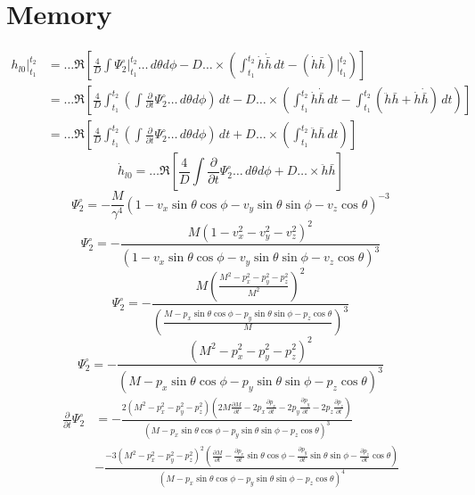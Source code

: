 \documentclass[a3paper]{ctexart}
\title{}
\author{}
\begin{document}
\section{Memory}
\begin{align*}
    h_{l0}\vert_{t_1}^{t_2}&=\dots\Re\left[
        \frac{4}{D}\int\Psi_2^\circ\vert_{t_1}^{t_2}\dots\,d\theta d\phi
        -D\dots\times\left(
            \int_{t_1}^{t_2}\dot{h}\dot{\bar{h}}\,dt
            -(\dot{h}\bar{h})\vert_{t_1}^{t_2}
        \right)
    \right]\\
    &=\dots\Re\left[
        \frac{4}{D}\int_{t_1}^{t_2}\left(\int\frac{\partial}{\partial t}\Psi_2^\circ\dots\,d\theta d\phi\right)\,dt
        -D\dots\times\left(
            \int_{t_1}^{t_2}\dot{h}\dot{\bar{h}}\,dt
            -\int_{t_1}^{t_2}(\ddot{h}\bar{h}+\dot{h}\dot{\bar{h}})\,dt
        \right)
    \right]\\
    &=\dots\Re\left[
        \frac{4}{D}\int_{t_1}^{t_2}\left(\int\frac{\partial}{\partial t}\Psi_2^\circ\dots\,d\theta d\phi\right)\,dt
        +D\dots\times\left(
            \int_{t_1}^{t_2}\ddot{h}\bar{h}\,dt
        \right)
    \right]
\end{align*}
\begin{equation*}
    \dot{h}_{l0}=\dots\Re\left[
        \frac{4}{D}\int\frac{\partial}{\partial t}\Psi_2^\circ\dots\,d\theta d\phi
        +D\dots\times\ddot{h}\bar{h}
    \right]
\end{equation*}
\begin{equation*}
    \Psi_2^\circ=-\frac{M}{\gamma^4}(1-v_x\sin\theta\cos\phi-v_y\sin\theta\sin\phi-v_z\cos\theta)^{-3}
\end{equation*}
\begin{equation*}
    \Psi_2^\circ=-\frac{M(1-v_x^2-v_y^2-v_z^2)^2}{(1-v_x\sin\theta\cos\phi-v_y\sin\theta\sin\phi-v_z\cos\theta)^3}
\end{equation*}
\begin{equation*}
    \Psi_2^\circ=-\frac{M(\frac{M^2-p_x^2-p_y^2-p_z^2}{M^2})^2}
    {(\frac{M-p_x\sin\theta\cos\phi-p_y\sin\theta\sin\phi-p_z\cos\theta}{M})^3}
\end{equation*}
\begin{equation*}
    \Psi_2^\circ=-\frac{(M^2-p_x^2-p_y^2-p_z^2)^2}
    {(M-p_x\sin\theta\cos\phi-p_y\sin\theta\sin\phi-p_z\cos\theta)^3}
\end{equation*}
\begin{align*}
    \frac{\partial}{\partial t}\Psi_2^\circ&=
    -\frac{2(M^2-p_x^2-p_y^2-p_z^2)
    (2M\frac{\partial M}{\partial t}-2p_x\frac{\partial p_x}{\partial t}-2p_y\frac{\partial p_y}{\partial t}-2p_z\frac{\partial p_z}{\partial t})}
    {(M-p_x\sin\theta\cos\phi-p_y\sin\theta\sin\phi-p_z\cos\theta)^3}\\
    &-\frac{-3(M^2-p_x^2-p_y^2-p_z^2)^2
    (\frac{\partial M}{\partial t}-\frac{\partial p_x}{\partial t}\sin\theta\cos\phi-\frac{\partial p_y}{\partial t}\sin\theta\sin\phi-\frac{\partial p_z}{\partial t}\cos\theta)}
    {(M-p_x\sin\theta\cos\phi-p_y\sin\theta\sin\phi-p_z\cos\theta)^4}
\end{align*}
\end{document}

